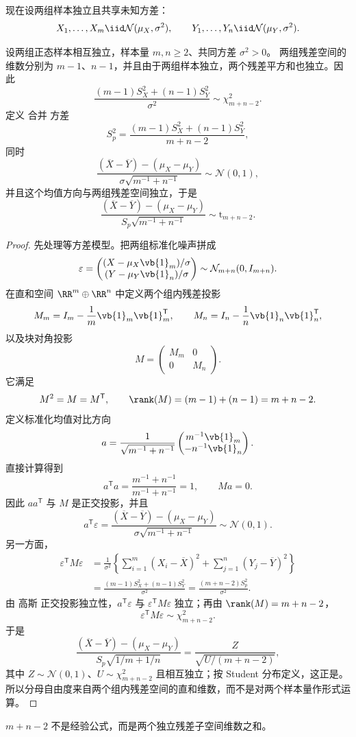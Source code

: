 现在设两组样本独立且共享未知方差：
\[
 X_1,\ldots,X_m\iid\mathcal N(\mu_X,\sigma^2),
 \qquad
 Y_1,\ldots,Y_n\iid\mathcal N(\mu_Y,\sigma^2).
\]
\begin{theorem}[独立等方差正态样本的合并 t 枢轴]
设两组正态样本相互独立，样本量 $m,n\ge2$、共同方差 $\sigma^2>0$。
两组残差空间的维数分别为 $m-1$、$n-1$，并且由于两组样本独立，两个残差平方和也独立。因此
\[
 \frac{(m-1)S_X^2+(n-1)S_Y^2}{\sigma^2}
 \sim\chi^2_{m+n-2}.
\]
定义 合并 方差
\[
 S_p^2
 =\frac{(m-1)S_X^2+(n-1)S_Y^2}{m+n-2},
\]
同时
\[
 \frac{(\overline X-\overline Y)-(\mu_X-\mu_Y)}
 {\sigma\sqrt{m^{-1}+n^{-1}}}
 \sim\mathcal N(0,1),
\]
并且这个均值方向与两组残差空间独立，于是
\begin{equation}\label{eq:math-stat-pooled-two-sample-t}
 \frac{(\overline X-\overline Y)-(\mu_X-\mu_Y)}
 {S_p\sqrt{m^{-1}+n^{-1}}}
 \sim\mathrm t_{m+n-2}.
\end{equation}
\end{theorem}
\begin{proof}
先处理等方差模型。把两组标准化噪声拼成
\[
 \varepsilon
 =\begin{pmatrix}
 (X-\mu_X\vb{1}_m)/\sigma\\
 (Y-\mu_Y\vb{1}_n)/\sigma
 \end{pmatrix}
 \sim\mathcal N_{m+n}(0,I_{m+n}).
\]
在直和空间 $\RR^m\oplus\RR^n$ 中定义两个组内残差投影
\[
 M_m=I_m-\frac1m\vb{1}_m\vb{1}_m^{\mathsf T},
 \qquad
 M_n=I_n-\frac1n\vb{1}_n\vb{1}_n^{\mathsf T},
\]
以及块对角投影
\[
 M=\begin{pmatrix}
 M_m&0\\
 0&M_n
 \end{pmatrix}.
\]
它满足
\[
 M^2=M=M^{\mathsf T},
 \qquad
 \rank(M)=(m-1)+(n-1)=m+n-2.
\]
定义标准化均值对比方向
\[
 a
 =\frac{1}{\sqrt{m^{-1}+n^{-1}}}
 \begin{pmatrix}
 m^{-1}\vb{1}_m\\
 -n^{-1}\vb{1}_n
 \end{pmatrix}.
\]
直接计算得到
\[
 a^{\mathsf T}a
 =\frac{m^{-1}+n^{-1}}{m^{-1}+n^{-1}}
 =1,
 \qquad
 Ma=0.
\]
因此 $aa^{\mathsf T}$ 与 $M$ 是正交投影，并且
\[
 a^{\mathsf T}\varepsilon
 =\frac{(\overline X-\overline Y)-(\mu_X-\mu_Y)}
 {\sigma\sqrt{m^{-1}+n^{-1}}}
 \sim\mathcal N(0,1).
\]
另一方面，
\begin{align*}
 \varepsilon^{\mathsf T}M\varepsilon
 &=\frac{1}{\sigma^2}
 \left\{
 \sum_{i=1}^m(X_i-\overline X)^2
 +\sum_{j=1}^n(Y_j-\overline Y)^2
 \right\}\\
 &=\frac{(m-1)S_X^2+(n-1)S_Y^2}{\sigma^2}
 =\frac{(m+n-2)S_p^2}{\sigma^2}.
\end{align*}
由 高斯 正交投影独立性，$a^{\mathsf T}\varepsilon$ 与
$\varepsilon^{\mathsf T}M\varepsilon$ 独立；再由 $\rank(M)=m+n-2$，
\[
 \varepsilon^{\mathsf T}M\varepsilon\sim\chi^2_{m+n-2}.
\]
于是
\[
 \frac{(\overline X-\overline Y)-(\mu_X-\mu_Y)}
 {S_p\sqrt{1/m+1/n}}
 =\frac{Z}{\sqrt{U/(m+n-2)}},
\]
其中 $Z\sim\mathcal N(0,1)$、$U\sim\chi^2_{m+n-2}$ 且相互独立；按 Student 分布定义，这正是。所以分母自由度来自两个组内残差空间的直和维数，而不是对两个样本量作形式运算。
\end{proof}
$m+n-2$ 不是经验公式，而是两个独立残差子空间维数之和。

